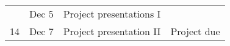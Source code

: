{\begin{table}[]
\begin{tabular}{|c|c|c|c|}
                         & Dec 5   & Project presentations I                                                                                                     &                                                                         \\ \cline{2-3}
    \multirow{-2}{*}{14} & Dec 7   & Project presentation II                                                                                                     & \multirow{-2}{*}{Project due}                                           \\ \hline
    \end{tabular}
\end{table}
}
